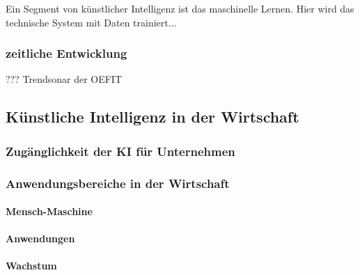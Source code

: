 \documentclass[a4paper,12pt, german]{report}
\begin{document}
Ein Segment von künstlicher Intelligenz ist das maschinelle Lernen. Hier wird das technische System mit Daten trainiert...


\subsubsection{zeitliche Entwicklung}

??? 
Trendsonar der OEFIT


\subsection{Künstliche Intelligenz in der Wirtschaft}

\subsubsection{Zugänglichkeit der KI für Unternehmen}

\subsubsection{Anwendungsbereiche in der Wirtschaft}

\paragraph{Mensch-Maschine}


\paragraph{Anwendungen}


\paragraph{Wachstum}

\end{document}
